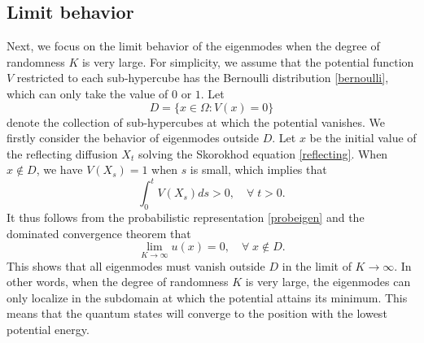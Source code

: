 \documentclass[a4paper,11pt]{article}
\begin{document}
\subsection{Limit behavior}

Next, we focus on the limit behavior of the eigenmodes when the degree of randomness $K$ is very large. For simplicity, we assume that the potential function $V$ restricted to each sub-hypercube has the Bernoulli distribution \eqref{bernoulli}, which can only take the value of $0$ or $1$. Let
\begin{equation*}
D = \{x \in \Omega: V(x) = 0\}
\end{equation*}
denote the collection of sub-hypercubes at which the potential vanishes. We firstly consider the behavior of eigenmodes outside $D$. Let $x$ be the initial value of the reflecting diffusion $X_t$ solving the Skorokhod equation \eqref{reflecting}. When $x \notin D$, we have $V(X_s) = 1$ when $s$ is small, which implies that
\begin{equation*}
\int_{0}^{t} V(X_s) ds > 0, \quad \forall \; t > 0.
\end{equation*}
It thus follows from the probabilistic representation \eqref{probeigen} and the dominated convergence theorem that
\begin{equation}\label{largeK}
\lim_{K \rightarrow \infty} u(x) = 0, \quad \forall \; x \notin D.
\end{equation}
This shows that all eigenmodes must vanish outside $D$ in the limit of $K \rightarrow \infty$. In other words, when the degree of randomness $K$ is very large, the eigenmodes can only localize in the subdomain at which the potential attains its minimum. This means that the quantum states will converge to the position with the lowest potential energy.
\end{document}

